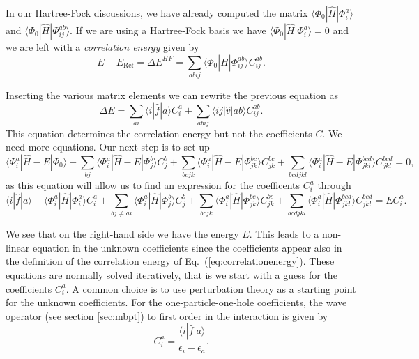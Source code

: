   In our Hartree-Fock discussions, we have already computed
  the matrix $\langle \Phi_0 | \hat{H}|\Phi_{i}^{a}\rangle $ and
  $\langle \Phi_0 | \hat{H}|\Phi_{ij}^{ab}\rangle$.  If we are using a
  Hartree-Fock basis we have $\langle \Phi_0 | \hat{H}|\Phi_{i}^{a}\rangle=0$
  and we are left with a \emph{correlation energy} given by
  \[
  E-E_{\mathrm{Ref}} =\Delta E^{HF}=\sum_{abij}\langle \Phi_0 |
  \hat{H}|\Phi_{ij}^{ab} \rangle C_{ij}^{ab}.
  \]


  Inserting the various matrix elements we can rewrite the previous
  equation as
  \begin{equation}\label{eq:correlationenergy}
  \Delta E=\sum_{ai}\langle i| \hat{f}|a \rangle C_{i}^{a}+
  \sum_{abij}\langle ij | \hat{v}| ab \rangle C_{ij}^{ab}.
  \end{equation}
  This equation determines the correlation energy but not the
  coefficients $C$.  We need more equations. Our next step is to set
  up
  \[ 
  \langle \Phi_i^a | \hat{H} -E| \Phi_0\rangle + \sum_{bj}\langle
  \Phi_i^a | \hat{H} -E|\Phi_{j}^{b} \rangle C_{j}^{b}+
  \sum_{bcjk}\langle \Phi_i^a | \hat{H} -E|\Phi_{jk}^{bc} \rangle
  C_{jk}^{bc}+ \sum_{bcdjkl}\langle \Phi_i^a | \hat{H}
  -E|\Phi_{jkl}^{bcd} \rangle C_{jkl}^{bcd}=0,
  \]
  as this equation will allow us to find an expression for the
  coefficents $C_i^a$  through 
  \begin{equation}\label{eq:c1p1h}
  \langle i | \hat{f}| a\rangle +\langle \Phi_i^a |
  \hat{H}|\Phi_{i}^{a} \rangle C_{i}^{a}+ \sum_{bj\ne ai}\langle
  \Phi_i^a | \hat{H}|\Phi_{j}^{b} \rangle C_{j}^{b}+
  \sum_{bcjk}\langle \Phi_i^a | \hat{H}|\Phi_{jk}^{bc} \rangle
  C_{jk}^{bc}+ \sum_{bcdjkl}\langle \Phi_i^a |
  \hat{H}|\Phi_{jkl}^{bcd} \rangle C_{jkl}^{bcd}=EC_i^a.
  \end{equation}

  We see that on the right-hand side we have the energy $E$. This
  leads to a non-linear equation in the unknown coefficients since the coefficients appear also in the definition of the correlation
energy of Eq.~(\ref{eq:correlationenergy}).  These
  equations are normally solved iteratively, that is we  start
  with a guess for the coefficients $C_i^a$. A common choice is to
  use perturbation theory as a starting point for the unknown coefficients. For the one-particle-one-hole coefficients, the wave operator
(see section \ref{sec:mbpt}) to first order in the interaction is given by
  \[
   C_{i}^{a}=\frac{\langle i | \hat{f}|
     a\rangle}{\epsilon_i-\epsilon_a}.
  \]

